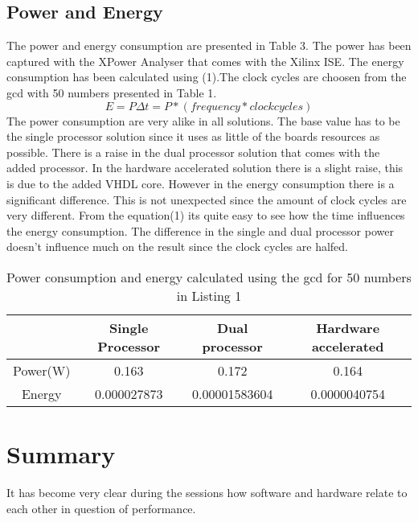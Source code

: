 \documentclass[11pt]{article}
\begin{document}
\subsection{Power and Energy}
The power and energy consumption are presented in Table 3. The power has been captured with the XPower Analyser that comes with the Xilinx ISE. The energy consumption has been calculated using (1).The clock cycles are choosen from the gcd with 50 numbers presented in Table 1. 
\begin{equation}
E = P \Delta t = P *(frequency*clock cycles)
\end{equation}
The power consumption are very alike in all solutions. The base value has to be the single processor solution since it uses as little of the boards resources as possible. There is a raise in the dual processor solution that comes with the added processor. In the hardware accelerated solution there is a slight raise, this is due to the added VHDL core.
However in the energy consumption there is a significant difference. This is not unexpected since the amount of clock cycles are very different. From the equation(1) its quite easy to see how the time influences the energy consumption. The difference in the single and dual processor power doesn't influence much on the result since the clock cycles are halfed.

\begin{table}[htbp]
   \centering
   \begin{tabular}{@{} cccc @{}} %
      \toprule
      \cmidrule(r){1-2} %
		& Single Processor	& Dual processor	& Hardware accelerated\\
      \midrule
      Power(W)	& 0.163			& 0.172			& 0.164\\

      Energy	& 0.000027873 		& 0.00001583604		& 0.0000040754\\
      \bottomrule
   \end{tabular}
   \caption{Power consumption and energy calculated using the gcd for 50 numbers in Listing 1}
   \label{tab:Clockcycles}
\end{table}

\section{Summary}
It has become very clear during the sessions how software and hardware relate to each other in question of performance.



\end{document}
